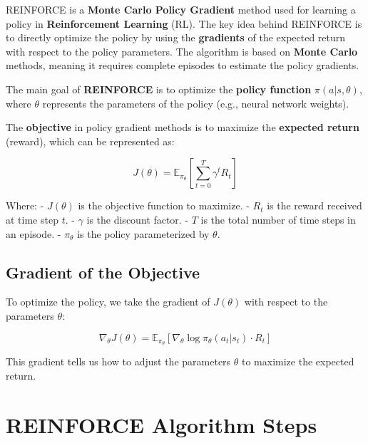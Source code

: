 \documentclass[
]{book}
\begin{document}
REINFORCE is a \textbf{Monte Carlo Policy Gradient} method used for learning a policy in \textbf{Reinforcement Learning} (RL). The key idea behind REINFORCE is to directly optimize the policy by using the \textbf{gradients} of the expected return with respect to the policy parameters. The algorithm is based on \textbf{Monte Carlo} methods, meaning it requires complete episodes to estimate the policy gradients.

The main goal of \textbf{REINFORCE} is to optimize the \textbf{policy function} \(\pi(a | s, \theta)\), where \(\theta\) represents the parameters of the policy (e.g., neural network weights).

The \textbf{objective} in policy gradient methods is to maximize the \textbf{expected return} (reward), which can be represented as:

\[
J(\theta) = \mathbb{E}_{\pi_\theta} \left[ \sum_{t=0}^{T} \gamma^t R_t \right]
\]

Where:
- \(J(\theta)\) is the objective function to maximize.
- \(R_t\) is the reward received at time step \(t\).
- \(\gamma\) is the discount factor.
- \(T\) is the total number of time steps in an episode.
- \(\pi_\theta\) is the policy parameterized by \(\theta\).

\subsection{Gradient of the Objective}\label{gradient-of-the-objective}

To optimize the policy, we take the gradient of \(J(\theta)\) with respect to the parameters \(\theta\):

\[
\nabla_\theta J(\theta) = \mathbb{E}_{\pi_\theta} \left[ \nabla_\theta \log \pi_\theta (a_t | s_t) \cdot R_t \right]
\]

This gradient tells us how to adjust the parameters \(\theta\) to maximize the expected return.

\section{REINFORCE Algorithm Steps}\label{reinforce-algorithm-steps}
\end{document}
